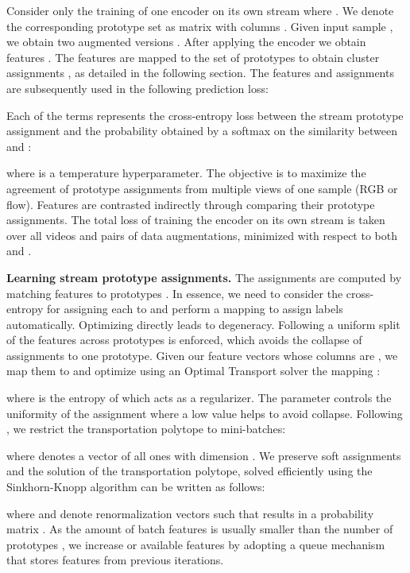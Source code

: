 \documentclass[10pt,twocolumn,letterpaper]{article}
\begin{document}
Consider only the training of one encoder  on its own stream  where . We denote the corresponding prototype set as matrix  with columns . Given input sample , we obtain two augmented versions . After applying the encoder  we obtain features . The features are mapped to the set of prototypes  to obtain cluster assignments , as detailed in the following section. The features and assignments are subsequently used in the following prediction loss: 

Each of the terms represents the cross-entropy loss between the stream prototype assignment  and the probability obtained by a softmax on the similarity between  and : 

where  is a temperature hyperparameter. The objective is to maximize the agreement of prototype assignments from multiple views of one sample (RGB or flow). Features are contrasted indirectly through comparing their prototype assignments. The total loss of training the encoder  on its own stream is taken over all videos and pairs of data augmentations, minimized with respect to both  and . 

\textbf{Learning stream prototype assignments.} The assignments  are computed by matching features  to prototypes . In essence, we need to consider the cross-entropy for assigning each  to  and perform a mapping to assign labels automatically. Optimizing  directly leads to degeneracy. Following \cite{asano_self-labelling_2020, caron_unsupervised_2020} a uniform split of the features across prototypes is enforced, which avoids the collapse of assignments to one prototype. Given our feature vectors  whose columns are , we map them to  and optimize using an Optimal Transport \cite{optimal_transport} solver the mapping : 

where  is the entropy of  which acts as a regularizer. The  parameter controls the uniformity of the assignment where a low value helps to avoid collapse. Following \cite{caron_unsupervised_2020}, we restrict the transportation polytope to mini-batches: 

where  denotes a vector of all ones with dimension . We preserve soft assignments  and the solution of the transportation polytope, solved efficiently using the Sinkhorn-Knopp algorithm \cite{cuturi_sinkhorn_2013} can be written as follows:

where  and  denote renormalization vectors such that  results in a probability matrix \cite{cuturi_sinkhorn_2013}. As the amount of batch features  is usually smaller than the number of prototypes , we increase or available features  by adopting a queue mechanism that stores features from previous iterations. 
\end{document}
